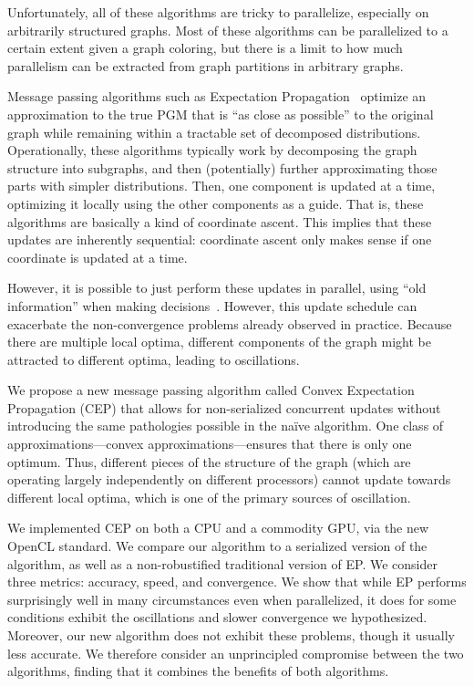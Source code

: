 \documentclass[times, 10pt,twocolumn]{article}
\begin{document}
Unfortunately, all of these algorithms are tricky to parallelize,
especially on arbitrarily structured graphs. Most of these algorithms
can be parallelized to a certain extent given a graph coloring, but
there is a limit to how much parallelism can be extracted from graph
partitions in arbitrary graphs.

Message passing algorithms such as Expectation
Propagation~\cite{Minka01} optimize an approximation to the true
PGM that is ``as close as possible'' to the original graph while
remaining within a tractable set of decomposed distributions.
Operationally, these algorithms typically work by decomposing the
graph structure into subgraphs, and then (potentially) further
approximating those parts with simpler distributions. Then, one
component is updated at a time, optimizing it locally using the
other components as a guide. That is, these algorithms are basically
a kind of coordinate ascent. This implies that these updates are
inherently sequential: coordinate ascent only makes sense if one
coordinate is updated at a time.

However, it is possible to just perform these updates in parallel,
using ``old information'' when making decisions~\cite{CsekeHeskes2010}.
However, this update schedule can exacerbate the non-convergence
problems already observed in practice. Because there are multiple
local optima, different components of the graph might be attracted
to different optima, leading to oscillations.

We propose a new message passing algorithm called Convex Expectation
Propagation (CEP) that allows for non-serialized concurrent updates
without introducing the same pathologies possible in the na\"ive
algorithm.  One class of approximations---convex approximations---ensures
that there is only one optimum\cite{wainwright03trw}. Thus, different
pieces of the structure of the graph (which are operating largely
independently on different processors) cannot update towards different
local optima, which is one of the primary sources of oscillation.

We implemented CEP on both a CPU and a commodity GPU, via the new
OpenCL standard. We compare our algorithm to a serialized version
of the algorithm, as well as a non-robustified traditional version
of EP. We consider three metrics: accuracy, speed, and convergence.
We show that while EP performs surprisingly well in many circumstances
even when parallelized, it does for some conditions exhibit the
oscillations and slower convergence we hypothesized. Moreover, our
new algorithm does not exhibit these problems, though it usually
less accurate. We therefore consider an unprincipled compromise
between the two algorithms, finding that it combines the benefits of
both algorithms.
\end{document}
